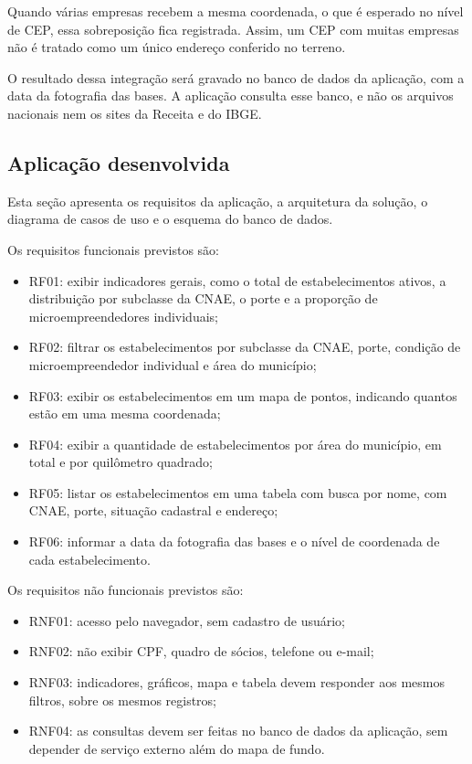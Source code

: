 Quando várias empresas recebem a mesma coordenada, o que é esperado no nível de CEP, essa sobreposição fica registrada.
Assim, um CEP com muitas empresas não é tratado como um único endereço conferido no terreno.

O resultado dessa integração será gravado no banco de dados da aplicação, com a data da fotografia das bases.
A aplicação consulta esse banco, e não os arquivos nacionais nem os sites da Receita e do IBGE.

\subsection{Aplicação desenvolvida}

Esta seção apresenta os requisitos da aplicação, a arquitetura da solução, o diagrama de casos de uso e o esquema do banco de dados.

Os requisitos funcionais previstos são:

\begin{itemize}
    \item RF01: exibir indicadores gerais, como o total de estabelecimentos ativos, a distribuição por subclasse da CNAE, o porte e a proporção de microempreendedores individuais;
    \item RF02: filtrar os estabelecimentos por subclasse da CNAE, porte, condição de microempreendedor individual e área do município;
    \item RF03: exibir os estabelecimentos em um mapa de pontos, indicando quantos estão em uma mesma coordenada;
    \item RF04: exibir a quantidade de estabelecimentos por área do município, em total e por quilômetro quadrado;
    \item RF05: listar os estabelecimentos em uma tabela com busca por nome, com CNAE, porte, situação cadastral e endereço;
    \item RF06: informar a data da fotografia das bases e o nível de coordenada de cada estabelecimento.
\end{itemize}

Os requisitos não funcionais previstos são:

\begin{itemize}
    \item RNF01: acesso pelo navegador, sem cadastro de usuário;
    \item RNF02: não exibir CPF, quadro de sócios, telefone ou e-mail;
    \item RNF03: indicadores, gráficos, mapa e tabela devem responder aos mesmos filtros, sobre os mesmos registros;
    \item RNF04: as consultas devem ser feitas no banco de dados da aplicação, sem depender de serviço externo além do mapa de fundo.
\end{itemize}

